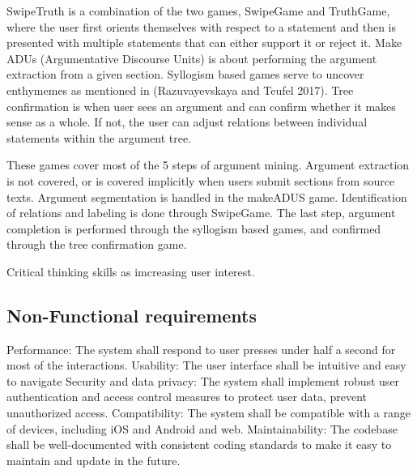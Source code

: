 \documentclass{article}
\begin{document}
SwipeTruth is a combination of the two games, SwipeGame and TruthGame, where the user first orients themselves with respect to a statement and then is presented with multiple statements that can either support it or reject it.
Make ADUs (Argumentative Discourse Units) is about performing the argument extraction from a given section.
Syllogism based games serve to uncover enthymemes as mentioned in (Razuvayevskaya and Teufel 2017). 
Tree confirmation is when user sees an argument and can confirm whether it makes sense as a whole. If not, the user can adjust relations between individual statements within the argument tree.

These games cover most of the 5 steps of argument mining. 
Argument extraction is not covered, or is covered implicitly when users submit sections from source texts. Argument segmentation is handled in the makeADUS game. Identification of relations and labeling is done through SwipeGame. The last step, argument completion is performed through the syllogism based games, and confirmed through the tree confirmation game.


Critical thinking skills as imcreasing user interest.

\subsection{Non-Functional requirements}
Performance: The system shall respond to user presses under half a second for most of the interactions.
Usability: The user interface shall be intuitive and easy to navigate
Security and data privacy: The system shall implement robust user authentication and access control measures to protect user data, prevent unauthorized access.
Compatibility: The system shall be compatible with a range of devices, including iOS and Android and web.
Maintainability: The codebase shall be well-documented with consistent coding standards to make it easy to maintain and update in the future.
\end{document}
